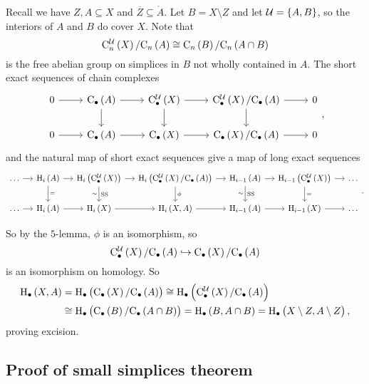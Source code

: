 \begin{example*}[Excision]
Recall we have $ Z, A \subseteq X $ and $ \overline{Z} \subseteq \mathring{A} $. Let $ B = X \setminus Z $ and let $ \UUU = \cbr{A, B} $, so the interiors of $ A $ and $ B $ do cover $ X $. Note that
$$ \C_n^\UUU\br{X} / \C_n\br{A} \cong \C_n\br{B} / \C_n\br{A \cap B} $$
is the free abelian group on simplices in $ B $ not wholly contained in $ A $. The short exact sequences of chain complexes
$$
\begin{tikzcd}
0 \arrow{r} & \C_\bullet\br{A} \arrow{r} \arrow{d} & \C_\bullet^\UUU\br{X} \arrow{r} \arrow{d} & \C_\bullet^\UUU\br{X} / \C_\bullet\br{A} \arrow{r} \arrow{d} & 0 \\
0 \arrow{r} & \C_\bullet\br{A} \arrow{r} & \C_\bullet\br{X} \arrow{r} & \C_\bullet\br{X} / \C_\bullet\br{A} \arrow{r} & 0
\end{tikzcd},
$$
and the natural map of short exact sequences give a map of long exact sequences
$$
\begin{tikzcd}[column sep=small]
\dots \arrow{r} & \H_i\br{A} \arrow{r} \arrow{d}{=} & \H_i\br{\C_\bullet^\UUU\br{X}} \arrow{r} \arrow{d}{\text{SS}}[swap]{\sim} & \H_i\br{\C_\bullet^\UUU\br{X} / \C_\bullet\br{A}} \arrow{r} \arrow{d}{\phi} & \H_{i - 1}\br{A} \arrow{r} \arrow{d}{\text{SS}}[swap]{\sim} & \H_{i - 1}\br{\C_\bullet^\UUU\br{X}} \arrow{r} \arrow{d}{=} & \dots \\
\dots \arrow{r} & \H_i\br{A} \arrow{r} & \H_i\br{X} \arrow{r} & \H_i\br{X, A} \arrow{r} & \H_{i - 1}\br{A} \arrow{r} & \H_{i - 1}\br{X} \arrow{r} & \dots
\end{tikzcd}.
$$

\pagebreak

So by the $ 5 $-lemma, $ \phi $ is an isomorphism, so
$$ \C_\bullet^\UUU\br{X} / \C_\bullet\br{A} \hookrightarrow \C_\bullet\br{X} / \C_\bullet\br{A} $$
is an isomorphism on homology. So
\begin{align*}
\H_\bullet\br{X, A}
& = \H_\bullet\br{\C_\bullet\br{X} / \C_\bullet\br{A}}
\cong \H_\bullet\br{\C_\bullet^\UUU\br{X} / \C_\bullet\br{A}} \\
& \cong \H_\bullet\br{\C_\bullet\br{B} / \C_\bullet\br{A \cap B}}
= \H_\bullet\br{B, A \cap B}
= \H_\bullet\br{X \setminus Z, A \setminus Z},
\end{align*}
proving excision.
\end{example*}

\subsection{Proof of small simplices theorem}


